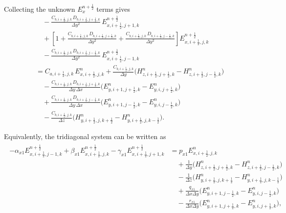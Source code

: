 \documentclass{article}
\numberwithin{equation}{section}
\numberwithin{figure}{section}
\begin{document}
Collecting the unknown $E_{x}^{n+\frac12}$ terms gives
\begin{equation}
    \begin{aligned}
         & \quad -\frac{C_{b,i+\tfrac12,j,k}\,D_{b,i+\tfrac12,j+\tfrac12,k}}{\Delta y^2}\, E_{x,i+\tfrac12,j+1,k}^{n+\frac12}                                                                                     \\
         & \quad + \left[1+\frac{C_{b,i+\tfrac12,j,k}\,D_{b,i+\tfrac12,j+\tfrac12,k}}{\Delta y^2} +\frac{C_{b,i+\tfrac12,j,k}\,D_{b,i+\tfrac12,j-\tfrac12,k}}{\Delta y^2}\right] E_{x,i+\tfrac12,j,k}^{n+\frac12} \\
         & \quad - \frac{C_{b,i+\tfrac12,j,k}\,D_{b,i+\tfrac12,j-\tfrac12,k}}{\Delta y^2}\, E_{x,i+\tfrac12,j-1,k}^{n+\frac12}                                                                                    \\
         & = C_{a,i+\tfrac12,j,k}\, E_{x,i+\tfrac12,j,k}^{n} + \frac{C_{b,i+\tfrac12,j,k}}{\Delta y} \Big(H_{z,i+\tfrac12,j+\tfrac12,k}^{n}-H_{z,i+\tfrac12,j-\tfrac12,k}^{n}\Big)                                \\
         & \quad - \frac{C_{b,i+\tfrac12,j,k}\,D_{b,i+\tfrac12,j+\tfrac12,k}}{\Delta y\,\Delta x} \Big(E_{y,i+1,j+\tfrac12,k}^{n}-E_{y,i,j+\tfrac12,k}^{n}\Big)                                                   \\
         & \quad + \frac{C_{b,i+\tfrac12,j,k}\,D_{b,i+\tfrac12,j-\tfrac12,k}}{\Delta y\,\Delta x} \Big(E_{y,i+1,j-\tfrac12,k}^{n}-E_{y,i,j-\tfrac12,k}^{n}\Big)                                                   \\
         & \quad - \frac{C_{b,i+\tfrac12,j,k}}{\Delta z} \Big(H_{y,i+\tfrac12,j,k+\tfrac12}^{n}-H_{y,i+\tfrac12,j,k-\tfrac12}^{n}\Big).
    \end{aligned}
\end{equation}

Equivalently, the tridiagonal system can be written as
\begin{align}
    \begin{split}
        -\alpha_{x1}E_{x,i+\tfrac12,j-1,k}^{n+\frac12} + \beta_{x1}E_{x,i+\tfrac12,j,k}^{n+\frac12} - \gamma_{x1}E_{x,i+\tfrac12,j+1,k}^{n+\frac12}
         & = p_{x1}E_{x,i+\tfrac12,j,k}^{n}                                                                       \\
         & \quad +\frac{1}{\Delta y}\Big(H_{z,i+\tfrac12,j+\tfrac12,k}^{n}-H_{z,i+\tfrac12,j-\tfrac12,k}^{n}\Big) \\
         & \quad -\frac{1}{\Delta z}\Big(H_{y,i+\tfrac12,j,k+\tfrac12}^{n}-H_{y,i+\tfrac12,j,k-\tfrac12}^{n}\Big) \\
         & \quad +\frac{q_{x1}}{\Delta x\Delta y}\Big(E_{y,i+1,j-\tfrac12,k}^{n}-E_{y,i,j-\tfrac12,k}^{n}\Big)    \\
         & \quad -\frac{r_{x1}}{\Delta x\Delta y}\Big(E_{y,i+1,j+\tfrac12,k}^{n}-E_{y,i,j+\tfrac12,k}^{n}\Big),
    \end{split}
    \label{eq:first-e-ex-adi-tridiagonal}
\end{align}
\end{document}
